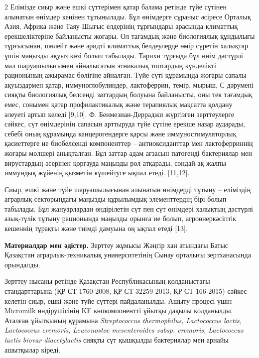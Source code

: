\begin{multicols}{2}
Елімізде сиыр және ешкі сүттерімен қатар балама ретінде түйе сүтінен
алынатын өнімдер кеңінен тұтынылады. Бұл өнімдерге сұраныс әсіресе
Орталық Азия, Африка және Таяу Шығыс елдерінің тұрғындары арасында
климаттық ерекшеліктеріне байланысты жоғары. Ол тағамдық және
биологиялық құндылығы тұрғысынан, шөлейт және аридті климаттық
белдеулерде өмір сүретін халықтар үшін маңызды ақуыз көзі болып
табылады. Тарихи тұрғыда бұл өнім дәстүрлі мал шаруашылығымен
айналысатын этникалық топтардың күнделікті рационының ажырамас бөлігіне
айналған. Түйе сүті құрамында жоғары сапалы ақуыздармен қатар,
иммуноглобулиндер, лактоферрин, темір, мырыш, С дәрумені сияқты
биологиялық белсенді заттардың болуына байланысты, оны тек тағамдық
емес, сонымен қатар профилактикалық және терапиялық мақсатта қолдану
әлеуеті артып келеді {[}9,10{]}. Ф. Бенмезиан-Дерраджи жүргізген
зерттеулерге сәйкес, сүт өнімдерінің сапасын арттыруда түйе сүтіне
ерекше назар аударады, себебі оның құрамында канцерогендерге қарсы және
иммуностимуляторлық қасиеттерге ие биобелсенді компоненттер --
антиоксиданттар мен лактоферриннің жоғары мөлшері анықталған. Бұл заттар
адам ағзасын патогенді бактериялар мен вирустардың әсерінен қорғауда
маңызды рөл атқарады, сондай-ақ жалпы иммундық жүйенің қызметін
күшейтуге ықпал етеді. {[}11,12{]}.

Сиыр, ешкі және түйе шаруашылығынан алынатын өнімдерді тұтыну --
еліміздің аграрлық секторындағы маңызды құрылымдық элементтердің бірі
болып табылады. Бұл жануарлардан өндірілетін сүт пен сүт өнімдері
халықтың дәстүрлі азық-түлік тұтыну рационында маңызды орынға ие болып,
агроөнеркәсіптік кешеннің тұрақты және тиімді дамуына оң ықпал етеді
{[}13{]}.

{\bfseries Материалдар мен әдістер.} Зерттеу жұмысы Жәңгір хан атындағы
Батыс Қазақстан аграрлық-техникалық университетінің Сынау орталығы
зертханасында орындалды.

Зерттеу нысаны ретінде Қазақстан Республикасының қолданыстағы
стандарттарына (ҚР СТ 1760-2008, ҚР СТ 32259-2013, ҚР СТ 166-2015)
сәйкес келетін сиыр, ешкі және түйе сүттері пайдаланылды. Ашыту процесі
үшін Micromilk өндірушісінің KF көпкомпонентті ұйытқы дақылы қолданылды.
Аталған ұйытқының құрамына \emph{Streptococcus thermophilus, Lactococcus
lactis, Lactococcus cremoris, Leuconostoc mesenteroides subsp. cremoris,
Lactococcus lactis biovar diacetylactis} сияқты сүт қышқылды бактериялар
мен арнайы ашытқылар кіреді.
\end{multicols}

\begin{figs}
\end{figs}

